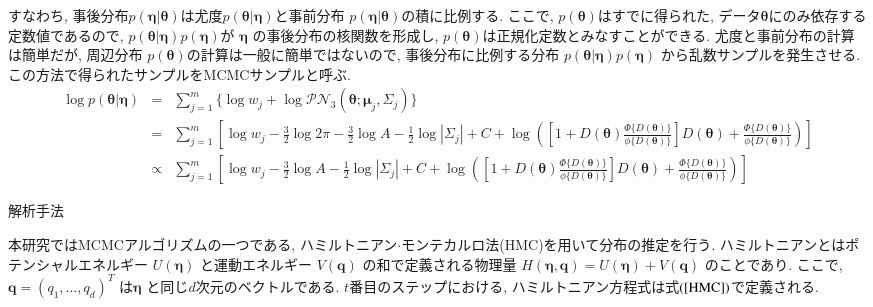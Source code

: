 \documentclass[a4j,11pt]{jarticle}
\makeatletter
\def\section{\@startsection{section}{1}{\z@}
   {0.8\Cvs \@plus.5\Cdp \@minus.2\Cdp}
   {0.2\Cvs \@plus.3\Cdp}
   {\normalfont \Large \bfseries}}
\def\subsection{\@startsection{subsection}{1}{\z@}
   {0.8\Cvs \@plus.5\Cdp \@minus.2\Cdp}
   {0.2\Cvs \@plus.3\Cdp}
   {\normalfont \normalsize \bfseries}}
\makeatother
\begin{document}
\vspace{-0.5zh}
\noindent
すなわち, 事後分布$p(\bm \eta | \bm \theta)$は尤度$p(\bm \theta | \bm \eta)$と事前分布 $p(\bm \eta| \bm \theta)$の積に比例する. ここで, $p(\bm \theta)$はすでに得られた, データ$\bm \theta$にのみ依存する定数値であるので, $p(\bm \theta | \bm \eta) p(\bm \eta)$が $\bm \eta$  の事後分布の核関数を形成し, $p(\bm \theta)$は正規化定数とみなすことができる. 尤度と事前分布の計算は簡単だが, 周辺分布 $p(\bm \theta)$の計算は一般に簡単ではないので, 事後分布に比例する分布 $p(\bm \theta | \bm \eta) p(\bm \eta)$ から乱数サンプルを発生させる. この方法で得られたサンプルをMCMCサンプルと呼ぶ. %
\vspace{-1zh}
\begin{eqnarray}
\label{logPNS}
\log p(\bm \theta | \bm \eta) &=& \sum^m_{j=1} \{\log w_j + \log \mathcal{PN}_3(\bm \theta;\bm \mu_j, \Sigma_j)\} \nonumber \\ 
&=& \sum^m_{j=1} \left[ \log w_j - \frac{3}{2} \log 2\pi - \frac{3}{2} \log A - \frac{1}{2} \log |\Sigma_j| + C + \log \left( \left[1 + D(\bm \theta) \frac{\Phi \{D(\bm \theta)\}}{\phi \{D(\bm \theta)\}} \right] D(\bm \theta) + \frac{\Phi \{D(\bm \theta)\}}{\phi \{D(\bm \theta)\}} \right)\right] \nonumber \\
&\propto& \sum^m_{j=1} \left[ \log w_j - \frac{3}{2} \log A - \frac{1}{2} \log |\Sigma_j| + C + \log \left( \left[1 + D(\bm \theta) \frac{\Phi \{D(\bm \theta)\}}{\phi \{D(\bm \theta)\}} \right] D(\bm \theta) + \frac{\Phi \{D(\bm \theta)\}}{\phi \{D(\bm \theta)\}} \right) \right]  
\end{eqnarray}
\fi
\vspace{-1zh}
\section{解析手法}

本研究ではMCMCアルゴリズムの一つである, ハミルトニアン$\cdot$モンテカルロ法(HMC)を用いて分布の推定を行う. 
ハミルトニアンとはポテンシャルエネルギー $U(\bm \eta)$ と運動エネルギー $V(\bm q)$ の和で定義される物理量 $H(\bm \eta, \bm q) = U(\bm \eta) + V(\bm q)$ のことであり. ここで, $\bm q = (q_1, \dots, q_d)^T$ は$\bm \eta$ と同じ$d$次元のベクトルである. $t$番目のステップにおける, ハミルトニアン方程式は式$(\ref{HMC})$で定義される. 
\end{document}
